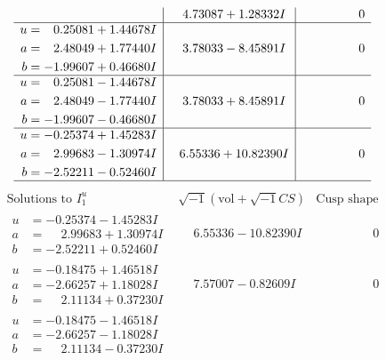 \documentclass[1p]{elsarticle_modified}
\theoremstyle{definition}
\newcommand{\I}{\sqrt{-1}}
\begin{document}
$$\begin{array}{c|c|c}
 & \phantom{-}4.73087 + 1.28332 I & \phantom{-0.000000 } 0 \\ \hline\begin{aligned}
u &= \phantom{-}0.25081 + 1.44678 I \\
a &= \phantom{-}2.48049 + 1.77440 I \\
b &= -1.99607 + 0.46680 I\end{aligned}
 & \phantom{-}3.78033 - 8.45891 I & \phantom{-0.000000 } 0 \\ \hline\begin{aligned}
u &= \phantom{-}0.25081 - 1.44678 I \\
a &= \phantom{-}2.48049 - 1.77440 I \\
b &= -1.99607 - 0.46680 I\end{aligned}
 & \phantom{-}3.78033 + 8.45891 I & \phantom{-0.000000 } 0 \\ \hline\begin{aligned}
u &= -0.25374 + 1.45283 I \\
a &= \phantom{-}2.99683 - 1.30974 I \\
b &= -2.52211 - 0.52460 I\end{aligned}
 & \phantom{-}6.55336 + 10.82390 I & \phantom{-0.000000 } 0\\
 \hline 
 \end{array}$$\newpage$$\begin{array}{c|c|c}  
\text{Solutions to }I^u_{1}& \I (\text{vol} + \sqrt{-1}CS) & \text{Cusp shape}\\
 \hline 
\begin{aligned}
u &= -0.25374 - 1.45283 I \\
a &= \phantom{-}2.99683 + 1.30974 I \\
b &= -2.52211 + 0.52460 I\end{aligned}
 & \phantom{-}6.55336 - 10.82390 I & \phantom{-0.000000 } 0 \\ \hline\begin{aligned}
u &= -0.18475 + 1.46518 I \\
a &= -2.66257 + 1.18028 I \\
b &= \phantom{-}2.11134 + 0.37230 I\end{aligned}
 & \phantom{-}7.57007 - 0.82609 I & \phantom{-0.000000 } 0 \\ \hline\begin{aligned}
u &= -0.18475 - 1.46518 I \\
a &= -2.66257 - 1.18028 I \\
b &= \phantom{-}2.11134 - 0.37230 I\end{aligned}

\end{array}$$
\end{document}
